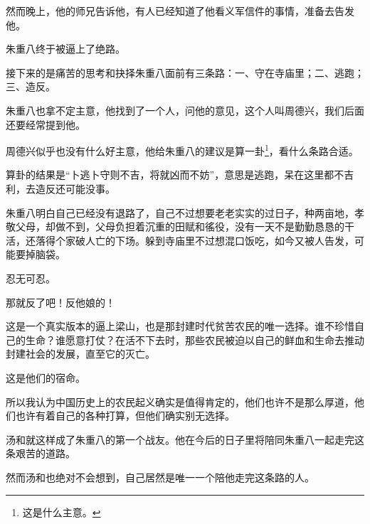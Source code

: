 \begin{multicols}{\theparacolNo}
		然而晚上，他的师兄告诉他，有人已经知道了他看义军信件的事情，准备去告发他。

		朱重八终于被逼上了绝路。

		接下来的是痛苦的思考和抉择朱重八面前有三条路：一、守在寺庙里；二、逃跑；三、造反。

		朱重八也拿不定主意，他找到了一个人，问他的意见，这个人叫周德兴，我们后面还要经常提到他。

		周德兴似乎也没有什么好主意，他给朱重八的建议是算一卦\footnote{这是什么主意。}，看什么条路合适。

		算卦的结果是“卜逃卜守则不吉，将就凶而不妨”，意思是逃跑，呆在这里都不吉利，去造反还可能没事。

		朱重八明白自己已经没有退路了，自己不过想要老老实实的过日子，种两亩地，孝敬父母，却做不到，父母负担着沉重的田赋和徭役，没有一天不是勤勤恳恳的干活，还落得个家破人亡的下场。躲到寺庙里不过想混口饭吃，如今又被人告发，可能要掉脑袋。

		忍无可忍。

		那就反了吧！反他娘的！

		这是一个真实版本的逼上梁山，也是那封建时代贫苦农民的唯一选择。谁不珍惜自己的生命？谁愿意打仗？在活不下去时，那些农民被迫以自己的鲜血和生命去推动封建社会的发展，直至它的灭亡。

		这是他们的宿命。

		所以我认为中国历史上的农民起义确实是值得肯定的，他们也许不是那么厚道，他们也许有着自己的各种打算，但他们确实别无选择。

		汤和就这样成了朱重八的第一个战友。他在今后的日子里将陪同朱重八一起走完这条艰苦的道路。

		然而汤和也绝对不会想到，自己居然是唯一一个陪他走完这条路的人。
		\ifnum{}
	\end{multicols}
\fi
\newpage
